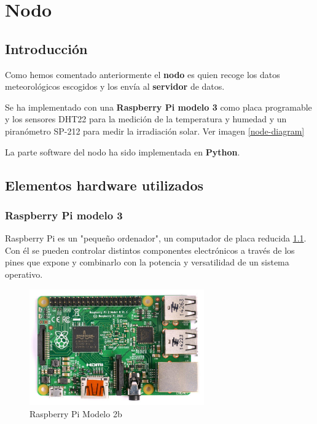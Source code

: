 \cleardoublepage

\chapter{Nodo}
\label{makereference4}

\section{Introducción}
\label{makereference4.1}
Como hemos comentado anteriormente el \textbf{nodo} es quien recoge los datos meteorológicos escogidos y los envía al \textbf{servidor} de datos.

Se ha implementado con una \textbf{Raspberry Pi modelo 3} como placa programable y los sensores DHT22 para la medición de la temperatura y humedad y un piranómetro SP-212 para medir la irradiación solar. Ver imagen \ref{node-diagram}

La parte software del nodo ha sido implementada en \textbf{Python}.

\section{Elementos hardware utilizados}
\label{makereference4.2}

\subsection*{Raspberry Pi modelo 3}

Raspberry Pi  es un "pequeño ordenador", un computador de placa reducida \ref{rasp}. Con él se pueden controlar distintos componentes electrónicos a través de los pines que expone y combinarlo con la potencia y versatilidad de un sistema operativo.

\begin{figure}[htb]
	\begin{center}
		\includegraphics[height=5cm]{figures/Raspberry_Pi.jpg}
		\caption{Raspberry Pi Modelo 2b}
	\end{center}
	
	\label{rasp}
\end{figure}

